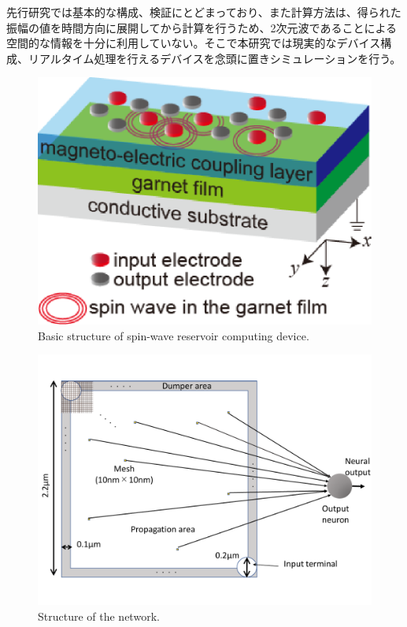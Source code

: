 \documentclass[a4j, twocolumn]{jsarticle}
\begin{document}
先行研究\cite{Nakane2018IEEEAccess:_Reser_Compu_with_spin_waves_Excit_in_a_Garne_film}では基本的な構成、検証にとどまっており、また計算方法は、得られた振幅の値を時間方向に展開してから計算を行うため、2次元波であることによる空間的な情報を十分に利用していない。そこで本研究では現実的なデバイス構成、リアルタイム処理を行えるデバイスを念頭に置きシミュレーションを行う。
\begin{figure}
\centering
\includegraphics[width=0.9\hsize]{./figures/deviceStructure.eps} 
\caption{Basic structure of spin-wave reservoir computing device\cite{Nakane2018IEEEAccess:_Reser_Compu_with_spin_waves_Excit_in_a_Garne_film}.}
\label{fig:basicstrct}
\end{figure}

\begin{figure}
\centering
\includegraphics[width=1\hsize]{./figures/selected_neuron_structure.pdf} 
\caption{Structure of the network.}
\label{fig:sond}
\end{figure}
\end{document}
